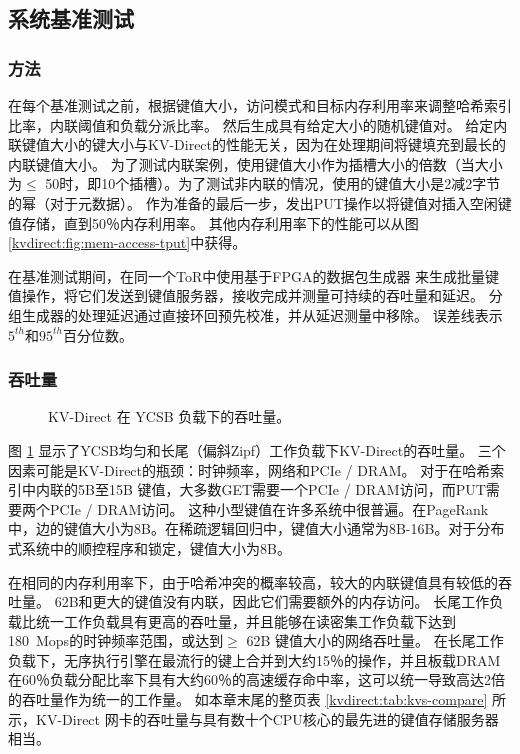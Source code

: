 \subsection{系统基准测试}
\label{kvdirect:sec:system-benchmark}

\subsubsection{方法}

在每个基准测试之前，根据键值大小，访问模式和目标内存利用率来调整哈希索引比率，内联阈值和负载分派比率。
然后生成具有给定大小的随机键值对。
给定内联键值大小的键大小与KV-Direct的性能无关，因为在处理期间将键填充到最长的内联键值大小。
为了测试内联案例，使用键值大小作为插槽大小的倍数（当大小为$ \leq $ 50时，即10个插槽）。为了测试非内联的情况，使用的键值大小是2减2字节的幂（对于元数据）。
作为准备的最后一步，发出PUT操作以将键值对插入空闲键值存储，直到50％内存利用率。
其他内存利用率下的性能可以从图 \ref {kvdirect:fig:mem-access-tput}中获得。

在基准测试期间，在同一个ToR中使用基于FPGA的数据包生成器 \cite {li2016clicknp}来生成批量键值操作，将它们发送到键值服务器，接收完成并测量可持续的吞吐量和延迟。
分组生成器的处理延迟通过直接环回预先校准，并从延迟测量中移除。
误差线表示$ 5^{th} $和$ 95^{th} $百分位数。

\subsubsection{吞吐量}

\begin{figure}[t]
\centering
{}
\caption{KV-Direct 在 YCSB 负载下的吞吐量。}
\label{kvdirect:fig:ycsb-tput}

\end{figure}

图 \ref {kvdirect:fig:ycsb-tput} 显示了YCSB均匀和长尾（偏斜Zipf）工作负载下KV-Direct的吞吐量。
三个因素可能是KV-Direct的瓶颈：时钟频率，网络和PCIe / DRAM。
对于在哈希索引中内联的5B至15B 键值，大多数GET需要一个PCIe / DRAM访问，而PUT需要两个PCIe / DRAM访问。
这种小型键值在许多系统中很普遍。在PageRank中，边的键值大小为8B。在稀疏逻辑回归中，键值大小通常为8B-16B。对于分布式系统中的顺控程序和锁定，键值大小为8B。

在相同的内存利用率下，由于哈希冲突的概率较高，较大的内联键值具有较低的吞吐量。
62B和更大的键值没有内联，因此它们需要额外的内存访问。
长尾工作负载比统一工作负载具有更高的吞吐量，并且能够在读密集工作负载下达到180~Mops的时钟频率范围，或达到$ \geq $ 62B 键值大小的网络吞吐量。
在长尾工作负载下，无序执行引擎在最流行的键上合并到大约15％的操作，并且板载DRAM在60％负载分配比率下具有大约60％的高速缓存命中率，这可以统一导致高达2倍的吞吐量作为统一的工作量。
如本章末尾的整页表 \ref {kvdirect:tab:kvs-compare} 所示，KV-Direct 网卡的吞吐量与具有数十个CPU核心的最先进的键值存储服务器相当。


